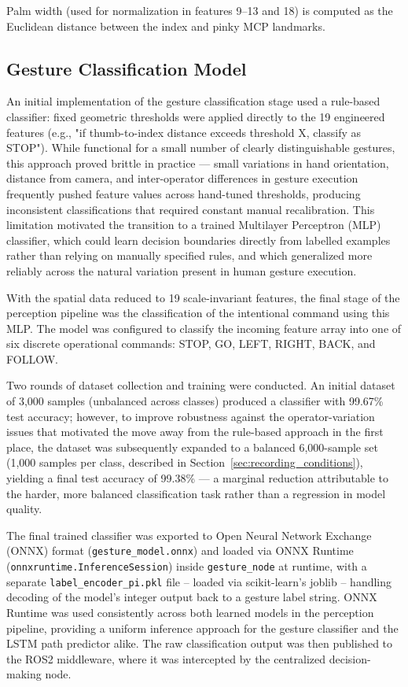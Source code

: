 Palm width (used for normalization in features 9--13 and 18) is computed as the Euclidean distance between the index and pinky MCP landmarks.

\subsection{Gesture Classification Model}
\label{sec:gesture_classification_model}
An initial implementation of the gesture classification stage used a rule-based classifier: fixed geometric thresholds were applied directly to the 19 engineered features (e.g., "if thumb-to-index distance exceeds threshold X, classify as STOP"). While functional for a small number of clearly distinguishable gestures, this approach proved brittle in practice — small variations in hand orientation, distance from camera, and inter-operator differences in gesture execution frequently pushed feature values across hand-tuned thresholds, producing inconsistent classifications that required constant manual recalibration. This limitation motivated the transition to a trained Multilayer Perceptron (MLP) classifier, which could learn decision boundaries directly from labelled examples rather than relying on manually specified rules, and which generalized more reliably across the natural variation present in human gesture execution.

With the spatial data reduced to 19 scale-invariant features, the final stage of the perception pipeline was the classification of the intentional command using this MLP. The model was configured to classify the incoming feature array into one of six discrete operational commands: STOP, GO, LEFT, RIGHT, BACK, and FOLLOW.

Two rounds of dataset collection and training were conducted. An initial dataset of 3,000 samples (unbalanced across classes) produced a classifier with 99.67\% test accuracy; however, to improve robustness against the operator-variation issues that motivated the move away from the rule-based approach in the first place, the dataset was subsequently expanded to a balanced 6,000-sample set (1,000 samples per class, described in Section~\ref{sec:recording_conditions}), yielding a final test accuracy of 99.38\% — a marginal reduction attributable to the harder, more balanced classification task rather than a regression in model quality.

The final trained classifier was exported to Open Neural Network Exchange (ONNX)
format (\texttt{gesture\_model.onnx}) and loaded via ONNX Runtime
(\texttt{onnxruntime.InferenceSession}) inside \texttt{gesture\_node} at runtime, with
a separate \texttt{label\_encoder\_pi.pkl} file -- loaded via scikit-learn's joblib --
handling decoding of the model's integer output back to a gesture label string. ONNX
Runtime was used consistently across both learned models in the perception pipeline,
providing a uniform inference approach for the gesture classifier and the LSTM path
predictor alike. The raw classification output was then published to the ROS2 middleware, where it was intercepted by the centralized decision-making node.

